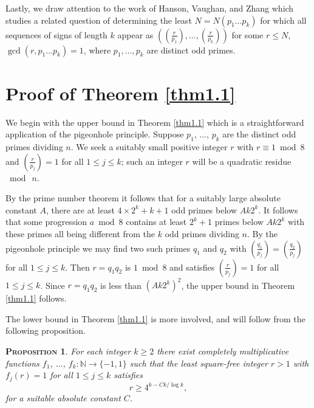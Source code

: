\documentclass[11pt,makeidx, reqno]{amsart}
\theoremstyle{mystyle}
\newtheorem{prop}[theorem]{\textsc{Proposition}}
\theoremstyle{definition}
\begin{document}
 

 


 



\par Lastly, we draw attention to the work of Hanson, Vaughan, and Zhang \cite{vaughanLeast} which studies a related question of determining the least $N = N(p_1 \dots p_k)$ for which all sequences of signs of length $k$ appear as $((\frac{r}{p_1}), \dots, (\frac{r}{p_k}))$ for some $r \le N$, $\gcd(r, p_1 \dots p_k) = 1$, where $p_1, \dots, p_k$ are distinct odd primes. 




\section{Proof of Theorem \ref{thm1.1}}\label{omega_Bounds}

\noindent We begin with the upper bound in Theorem \ref{thm1.1} which is a straightforward application of the pigeonhole principle.  Suppose $p_1$, $\ldots$, $p_k$ are the distinct odd primes dividing $n$.  We seek a suitably small positive integer $r$ with $r\equiv 1 \bmod 8$ and $(\frac{r}{p_j})=1$ for all $1\le j\le k$; such an integer $r$ will be a quadratic residue $\bmod \ n$. 

By the prime number theorem it follows that for a suitably large absolute constant $A$, there are at least $4 \times 2^k + k+1$ odd primes below $Ak 2^k$.  It follows that some progression $a \bmod 8$ contains at least $2^k +1$ primes below $Ak 2^k$ with these primes all being different from the $k$ odd primes dividing $n$.  By the pigeonhole principle we may find two such primes $q_1$ and $q_2$ with $(\frac{q_1}{p_j}) = (\frac{q_2}{p_j})$ for all $1\le j\le k$.   Then $r=q_1 q_2$ is $1\bmod 8$ and satisfies $(\frac{r}{p_j})=1$ for all $1\le j\le k$.  Since $r=q_1q_2$ is less  than $(Ak 2^k)^2$, the upper bound in Theorem \ref{thm1.1} follows.  


The lower bound in Theorem \ref{thm1.1} is more involved, and will follow from the following proposition.  

\begin{prop} \label{prop2.1}  For each integer $k\ge 2$ there exist completely multiplicative functions $f_1$, $\ldots$, $f_k : {\mathbb N} \to \{-1,1\}$ such that the least square-free integer $r>1$ with $f_j(r)=1$ for all $1\le j\le k$ satisfies 
$$ 
r \ge 4^{k-Ck/\log k}, 
$$
for a suitable absolute constant $C$. 
\end{prop} 
\end{document}
